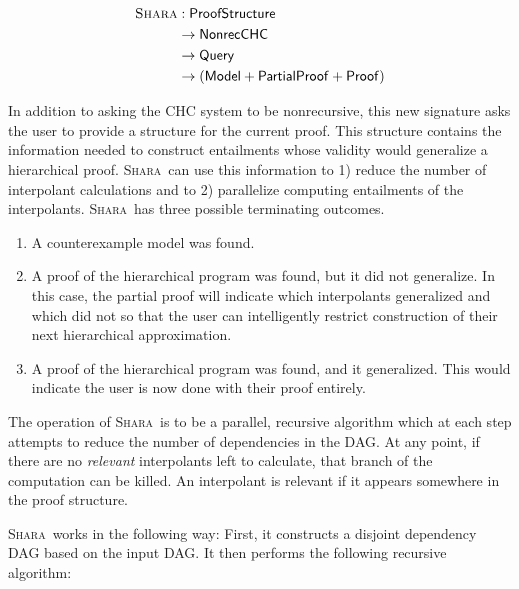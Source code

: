 \documentclass{article}
\newcommand{\SHARA}{\textsc{Shara}}
\begin{document}
\begin{align*}
\SHARA &: \mathsf{ProofStructure} \\
  &\rightarrow \mathsf{NonrecCHC} \\
  &\rightarrow \mathsf{Query} \\
  &\rightarrow (\mathsf{Model} + \mathsf{PartialProof} + \mathsf{Proof})
\end{align*}

In addition to asking the CHC system to be nonrecursive, this new signature
asks the user to provide a structure for the current proof. This structure
contains the information needed to construct entailments whose validity would
generalize a hierarchical proof.
%
\SHARA~can use this information to 1) reduce the number of interpolant
calculations and to 2) parallelize computing entailments of the interpolants.
%
\SHARA~has three possible terminating outcomes.
\begin{enumerate}
\item A counterexample model was found.
\item A proof of the hierarchical program was found, but it did not generalize.
In this case, the partial proof will indicate which interpolants generalized
and which did not so that the user can intelligently restrict construction of
their next hierarchical approximation.
\item A proof of the hierarchical program was found, and it generalized. This
would indicate the user is now done with their proof entirely.
\end{enumerate}

The operation of \SHARA~is to be a parallel, recursive algorithm which at each
step attempts to reduce the number of dependencies in the DAG. At any point, if
there are no \emph{relevant} interpolants left to calculate, that branch of the
computation can be killed. An interpolant is relevant if it appears somewhere
in the proof structure.

\SHARA~works in the following way: First, it constructs a disjoint dependency
DAG based on the input DAG. It then performs the following recursive algorithm:
\end{document}
